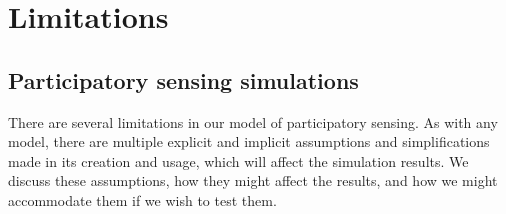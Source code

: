 



\section{Limitations}

\subsection{Participatory sensing simulations}

There are several limitations in our model of participatory sensing. As with
any model, there are multiple explicit and implicit assumptions and
simplifications made in its creation and usage, which will affect the
simulation results. We discuss these assumptions, how they might affect the
results, and how we might accommodate them if we wish to test them.

